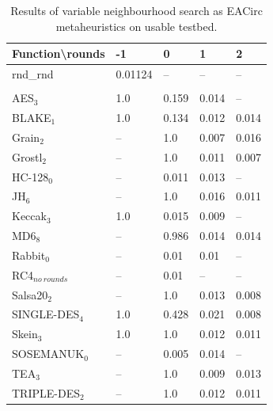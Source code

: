 \documentclass[
  print, %
  Table,   %
  nolof,     %
  nolot,     %
  11pt, %
  oneside  %
]{fithesis3}
\newcommand{\fd}{\cellcolor{red!13}}
\newcommand{\fn}{\cellcolor{green!13}}
\begin{document}
\begin{table}[H]
\centering
\begin{tabular}{l|l l l l}
Function\textbackslash{}rounds & -1 & 0 & 1 & 2\\ \hline
rnd\_rnd         & \fn{}0.01124 & --       & --         & --        \\\\
AES$_{3}$        & \fd{}1.0   & \fd{}0.159 & \fn{}0.014 & \fn{}--   \\
BLAKE$_{1}$      & \fd{}1.0   & \fd{}0.134 & \fn{}0.012 & \fn{}0.014\\
Grain$_{2}$      & \fd{}--    & \fd{}1.0   & \fn{}0.007 & \fn{}0.016\\
Grostl$_{2}$     & \fd{}--    & \fd{}1.0   & \fn{}0.011 & \fn{}0.007\\
HC-128$_{0}$     & \fd{}--    & \fn{}0.011 & \fn{}0.013 & \fn{}--   \\
JH$_{6}$         & \fd{}--    & \fd{}1.0   & \fn{}0.016 & \fn{}0.011\\
Keccak$_{3}$     & \fd{}1.0   & \fn{}0.015 & \fn{}0.009 & \fn{}--   \\
MD6$_{8}$        & \fd{}--    & \fd{}0.986 & \fn{}0.014 & \fn{}0.014\\
Rabbit$_{0}$     & \fd{}--    & \fn{}0.01  & \fn{}0.01  & \fn{}--   \\
RC4$_{no~rounds}$& --         & \fn{}0.01  & --         & --        \\
Salsa20$_{2}$    & \fd{}--    & \fd{}1.0   & \fn{}0.013 & \fn{}0.008\\
SINGLE-DES$_{4}$ & \fd{}1.0   & \fd{}0.428 & \fn{}0.021 & \fn{}0.008\\
Skein$_{3}$      & \fd{}1.0   & \fd{}1.0   & \fn{}0.012 & \fn{}0.011\\
SOSEMANUK$_{0}$  & \fd{}--    & \fn{}0.005 & \fn{}0.014 & \fn{}--   \\
TEA$_{3}$        & \fd{}--    & \fd{}1.0   & \fn{}0.009 & \fn{}0.013\\
TRIPLE-DES$_{2}$ & \fd{}--    & \fd{}1.0   & \fn{}0.012 & \fn{}0.011
\end{tabular}
\caption{Results of variable neighbourhood search as EACirc metaheuristics on usable testbed.}
\label{table:res-usable-vns}
\end{table}
\end{document}
